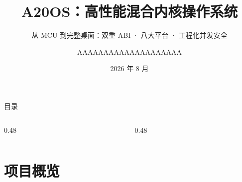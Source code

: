 \documentclass[aspectratio=1610]{beamer}
\title{A20OS：高性能混合内核操作系统}
\subtitle{从 MCU 到完整桌面：双重 ABI · 八大平台 · 工程化并发安全}
\author{AAAAAAAAAAAAAAAAAAAA} %
\institute{武汉大学}
\date{2026 年 8 月}
\begin{document}
\begin{frame}[plain]
    \titlepage
\end{frame}

\begin{frame}{目录}
    \footnotesize
    \begin{columns}[t]
        \begin{column}{0.48\textwidth}
            \tableofcontents[sections={1-7},hideallsubsections]
        \end{column}
        \begin{column}{0.48\textwidth}
            \tableofcontents[sections={8-13},hideallsubsections]
        \end{column}
    \end{columns}
\end{frame}

\renewcommand{\azsectionsummary}{%
    \statcard[0.23\linewidth]{19.2 万}{自研代码行数}\hfill
    \statcard[0.23\linewidth]{500}{双 ABI syscall（361 + 139）}\hfill
    \statcard[0.23\linewidth]{8}{指令集架构}\hfill
    \statcard[0.23\linewidth]{483}{次提交 / 20 周连续演进}}
\section{项目概览}
\end{document}
